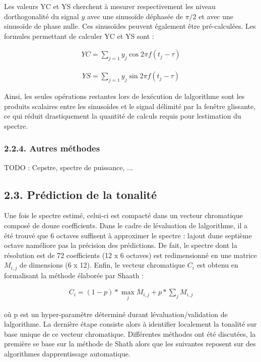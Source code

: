 \documentclass[letterpaper]{article}
\begin{document}
Les valeurs YC et YS cherchent à mesurer respectivement les niveau d\textquotesingle orthogonalité du signal $y$ avec une sinusoïde déphasée de $\pi / 2$
et avec une sinusoïde de phase nulle. Ces sinusoïdes peuvent également être pré-calculées. Les formules permettant de calculer YC et YS sont :

\begin{align}
YC = \sum\limits_{j=1} y_{j}\cos 2\pi f (t_{j} - \tau)
\end{align}

\begin{align}
YS = \sum\limits_{j=1} y_{j}\sin 2\pi f (t_{j} - \tau)
\end{align}

Ainsi, les seules opérations restantes lors de l\textquotesingle exécution de l\textquotesingle algorithme sont les produits scalaires entre les
sinusoïdes et le signal délimité par la fenêtre glissante, ce qui réduit drastiquement la quantité de calculs requis pour l\textquotesingle estimation du spectre.

\subsubsection*{2.2.4. Autres méthodes}

TODO : Cepstre, spectre de puissance, ...

\subsection*{2.3. Prédiction de la tonalité}

Une fois le spectre estimé, celui-ci est compacté dans un vecteur chromatique composé de douze coefficients. Dans le cadre de l\textquotesingle évaluation de l\textquotesingle algorithme, il a été trouvé que 6 octaves suffisent à approximer le spectre : l\textquotesingle ajout d\textquotesingle une septième octave n\textquotesingle améliore pas la précision des prédictions. De fait, le spectre dont la résolution est de 72 coefficients (12 x 6 octaves) est redimensionné en une matrice $M_{i, j}$ de dimensions (6 x 12). Enfin, le vecteur chromatique $C_{i}$ est obtenu en formalisant la méthode élaborée par Sha\textquotesingle ath :

\begin{align}
C_{i} = (1 - p) * \max_{j} M_{i, j} + p * \sum_{j} M_{i, j}
\end{align}

où p est un hyper-paramètre déterminé durant l\textquotesingle évaluation/validation de l\textquotesingle algorithme. La dernière étape consiste alors à identifier localement la tonalité sur base unique de ce vecteur chromatique. Différentes méthodes ont été discutées, la première se base sur la méthode de
Sh\textquotesingle ath alors que les suivantes reposent sur des algorithmes d\textquotesingle apprentissage automatique.
\end{document}
